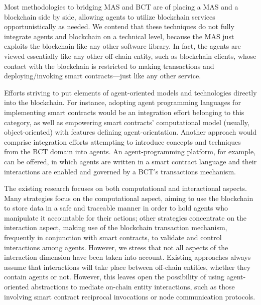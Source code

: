 Most methodologies to bridging \ac{MAS} and \ac{BCT} are of placing a \ac{MAS} and a blockchain side by side, allowing agents to utilize blockchain services opportunistically as needed. We contend that these techniques do not fully integrate agents and blockchain on a technical level, because the \ac{MAS} just exploits the blockchain like any other software library. In fact, the agents are viewed essentially like any other off-chain entity, such as blockchain clients, whose contact with the blockchain is restricted to making transactions and deploying/invoking smart contracts—just like any other service.

\vspace{.5cm}

Efforts striving to put elements of agent-oriented models and technologies directly into the blockchain.
For instance, adopting agent programming languages for implementing smart contracts would be an
integration effort belonging to this category, as well as empowering smart contracts’ computational
model (usually, object-oriented) with features defining agent-orientation. Another approach would comprise integration efforts attempting to introduce concepts and techniques from the \ac{BCT} domain into agents. An agent-programming platform, for example, can be offered, in which agents are written in a smart contract language and their interactions are enabled and governed by a \ac{BCT}'s transactions mechanism.


\vspace{.5cm}

The existing research focuses on both computational and interactional aspects. Many strategies focus on the computational aspect, aiming to use the blockchain to store data in a safe and traceable manner in order to hold agents who manipulate it accountable for their actions; other strategies concentrate on the interaction aspect, making use of the blockchain transaction mechanism, frequently in conjunction with smart contracts, to validate and control interactions among agents. However, we stress that not all aspects of the interaction dimension have been taken into account. Existing approaches always assume that interactions will take place between off-chain entities, whether they contain agents or not. However, this leaves open the possibility of using agent-oriented abstractions to mediate on-chain entity interactions, such as those involving smart contract reciprocal invocations or node communication protocols.

\vspace{.5cm}

